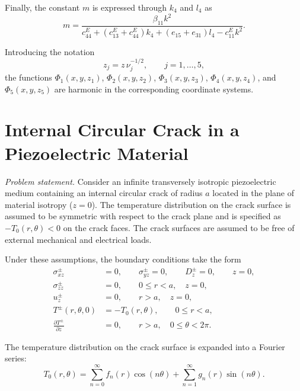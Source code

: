 Finally, the constant $m$ is expressed through $k_4$ and $l_4$ as
\begin{equation}
	m =
	\frac{\beta_{11}k^{2}}
	{c_{44}^{E}
		+ (c_{13}^{E}+c_{44}^{E})k_{4}
		+ (e_{15}+e_{31})l_{4}
		- c_{11}^{E}k^{2}} .
	\label{KirilyukEq12}
\end{equation}

Introducing the notation
\[
z_j = z\,\nu_j^{-1/2}, \qquad j=1,\dots,5,
\]
the functions $\Phi_1(x,y,z_1)$, $\Phi_2(x,y,z_2)$, $\Phi_3(x,y,z_3)$,
$\Phi_4(x,y,z_4)$, and $\Phi_5(x,y,z_5)$ are harmonic in the corresponding coordinate systems.

\section{Internal Circular Crack in a Piezoelectric Material}

\medskip
\emph{Problem statement.} Consider an infinite transversely isotropic piezoelectric medium containing an internal circular crack of radius $a$ located in the plane of material isotropy ($z=0$). 
The temperature distribution on the crack surface is assumed to be symmetric with respect to the crack plane and is specified as
$-T_{0}(r,\theta) < 0$ on the crack faces. 
The crack surfaces are assumed to be free of external mechanical and electrical loads.

Under these assumptions, the boundary conditions take the form
\begin{equation}
	\label{KirilyukEq1}
	\begin{aligned}
		\sigma_{xz}^{\pm} &= 0, \qquad 
		\sigma_{yz}^{\pm} = 0, \qquad 
		D_{z}^{\pm} = 0, 
		\qquad z=0, \\
		\sigma_{zz}^{\pm} &= 0, 
		\qquad 0 \le r < a, \quad z=0, \\
		u_{z}^{\pm} &= 0, 
		\qquad r > a, \quad z=0, \\
		T^{\pm}(r,\theta,0) &= -T_{0}(r,\theta), 
		\qquad 0 \le r < a, \\
		\frac{\partial T^{\pm}}{\partial z} &= 0,
		\qquad r>a, \quad 0 \le \theta < 2\pi .
	\end{aligned}
\end{equation}

The temperature distribution on the crack surface is expanded into a Fourier series:
\begin{equation}
	\label{KirilyukEq2}
	T_{0}(r,\theta)
	=
	\sum_{n=0}^{\infty} f_{n}(r)\cos(n\theta)
	+
	\sum_{n=1}^{\infty} g_{n}(r)\sin(n\theta).
\end{equation}

